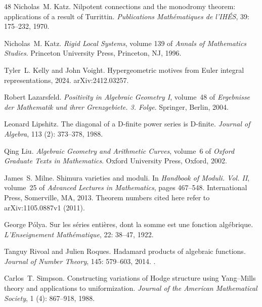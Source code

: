 \documentclass[11pt]{amsart}
\theoremstyle{definition}
\theoremstyle{remark}
\numberwithin{equation}{section}
\begin{document}
\begin{thebibliography}{48}
Nicholas~M. Katz.
\newblock Nilpotent connections and the monodromy theorem: applications of a
  result of {T}urrittin.
\newblock \emph{Publications Math{\'e}matiques de l'IH{\'E}S}, 39:
  175--232, 1970.

Nicholas~M. Katz.
\newblock \emph{Rigid Local Systems}, volume 139 of \emph{Annals of Mathematics
  Studies}.
\newblock Princeton University Press, Princeton, NJ, 1996.

Tyler~L. Kelly and John Voight.
\newblock Hypergeometric motives from {E}uler integral representations, 2024.
\newblock arXiv:2412.03257.

Robert Lazarsfeld.
\newblock \emph{Positivity in Algebraic Geometry {I}}, volume~48 of
  \emph{Ergebnisse der Mathematik und ihrer Grenzgebiete. 3. Folge}.
\newblock Springer, Berlin, 2004.

Leonard Lipshitz.
\newblock The diagonal of a {D}-finite power series is {D}-finite.
\newblock \emph{Journal of Algebra}, 113 (2): 373--378, 1988.

Qing Liu.
\newblock \emph{Algebraic Geometry and Arithmetic Curves}, volume~6 of
  \emph{Oxford Graduate Texts in Mathematics}.
\newblock Oxford University Press, Oxford, 2002.

James~S. Milne.
\newblock Shimura varieties and moduli.
\newblock In \emph{Handbook of Moduli. {V}ol. {II}}, volume~25 of
  \emph{Advanced Lectures in Mathematics}, pages 467--548. International Press,
  Somerville, MA, 2013.
\newblock Theorem numbers cited here refer to arXiv:1105.0887v1 (2011).

George P{\'o}lya.
\newblock Sur les s{\'e}ries enti{\`e}res, dont la somme est une fonction
  alg{\'e}brique.
\newblock \emph{L'Enseignement Math{\'e}matique}, 22: 38--47, 1922.

Tanguy Rivoal and Julien Roques.
\newblock Hadamard products of algebraic functions.
\newblock \emph{Journal of Number Theory}, 145: 579--603, 2014.
\newblock {}.

Carlos~T. Simpson.
\newblock Constructing variations of {H}odge structure using {Y}ang--{M}ills
  theory and applications to uniformization.
\newblock \emph{Journal of the American Mathematical Society}, 1
  (4): 867--918, 1988.


\end{thebibliography}
\end{document}
